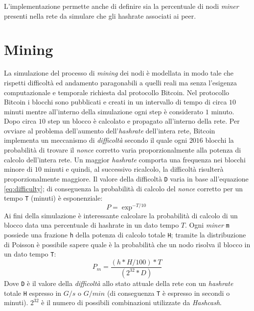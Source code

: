 L'implementazione permette anche di definire sia la percentuale di nodi \textit{miner} presenti nella rete da simulare che gli hashrate associati ai peer.

\section{Mining}
La simulazione del processo di \textit{mining} dei nodi è modellata in modo tale che rispetti difficoltà ed andamento paragonabili a quelli reali ma senza l'esigenza computazionale e temporale richiesta dal protocollo Bitcoin. Nel protocollo Bitcoin i blocchi sono pubblicati e creati in un intervallo di tempo di circa $10$ minuti mentre all'interno della simulazione ogni step è considerato $1$ minuto. Dopo circa $10$ step un blocco è calcolato e propagato all'interno della rete. Per ovviare al problema dell'aumento dell'\textit{hashrate} dell'intera rete, Bitcoin implementa un meccanismo di \textit{difficoltà} secondo il quale ogni $2016$ blocchi la probabilità di trovare il \textit{nonce} corretto varia proporzionalmente alla potenza di calcolo dell'intera rete. Un maggior \textit{hashrate} comporta una frequenza nei blocchi minore di $10$ minuti e quindi, al successivo ricalcolo, la difficoltà risulterà proporzionalmente maggiore.\newline
Il valore della difficoltà \texttt{D} varia in base all'equazione \ref{eq:difficulty}; di conseguenza la probabilità di calcolo del \textit{nonce} corretto per un tempo \texttt{T} (minuti) è esponenziale:
\begin{equation}
    P = \exp^{-T/10}
\end{equation}
Ai fini della simulazione è interessante calcolare la probabilità di calcolo di un blocco data una percentuale di hashrate in un dato tempo $T$. Ogni \textit{miner} \texttt{m} possiede una frazione \texttt{h} della potenza di calcolo totale \texttt{H}; tramite la distribuzione di Poisson è possibile sapere quale è la probabilità che un nodo risolva il blocco in un dato tempo \texttt{T}:
\begin{equation}\label{eq:mining}
    P_m = \frac{(h * H / 100) * T}{(2^{32} * D)}
\end{equation}
Dove \texttt{D} è il valore della \textit{difficoltà} allo stato attuale della rete con un \textit{hashrate} totale \texttt{H} espresso in $G/s$ o $G/min$ (di conseguenza \texttt{T} è espresso in secondi o minuti). $2^{32}$ è il numero di possibili combinazioni utilizzate da \textit{Hashcash}.\newline
